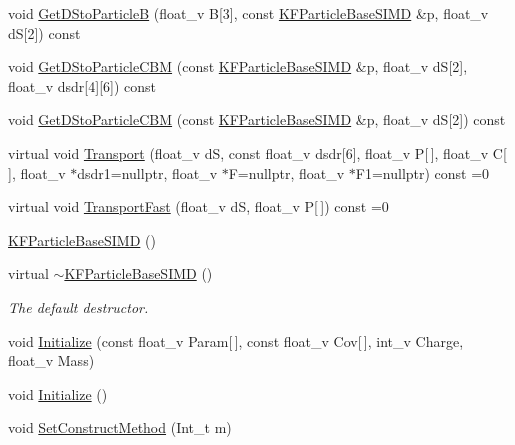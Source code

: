 \begin{DoxyCompactItemize}
\item 
void \hyperlink{classKFParticleBaseSIMD_a1b4d0c9300c389abefe0315f45faa26b}{Get\+D\+Sto\+ParticleB} (float\+\_\+v B\mbox{[}3\mbox{]}, const \hyperlink{classKFParticleBaseSIMD}{K\+F\+Particle\+Base\+S\+I\+MD} \&p, float\+\_\+v dS\mbox{[}2\mbox{]}) const 
\item 
void \hyperlink{classKFParticleBaseSIMD_acd7097a1ad5f82efff3812c01580e592}{Get\+D\+Sto\+Particle\+C\+BM} (const \hyperlink{classKFParticleBaseSIMD}{K\+F\+Particle\+Base\+S\+I\+MD} \&p, float\+\_\+v dS\mbox{[}2\mbox{]}, float\+\_\+v dsdr\mbox{[}4\mbox{]}\mbox{[}6\mbox{]}) const 
\item 
void \hyperlink{classKFParticleBaseSIMD_a0dd9de9d7915fd843abc49ffc9b53da1}{Get\+D\+Sto\+Particle\+C\+BM} (const \hyperlink{classKFParticleBaseSIMD}{K\+F\+Particle\+Base\+S\+I\+MD} \&p, float\+\_\+v dS\mbox{[}2\mbox{]}) const 
\item 
virtual void \hyperlink{classKFParticleBaseSIMD_aef008a05ee4b4c5c8fc88a8e7493ee70}{Transport} (float\+\_\+v dS, const float\+\_\+v dsdr\mbox{[}6\mbox{]}, float\+\_\+v P\mbox{[}$\,$\mbox{]}, float\+\_\+v C\mbox{[}$\,$\mbox{]}, float\+\_\+v $\ast$dsdr1=nullptr, float\+\_\+v $\ast$F=nullptr, float\+\_\+v $\ast$F1=nullptr) const =0
\item 
virtual void \hyperlink{classKFParticleBaseSIMD_a20c50860d7bc9f4e2c1047f8028320d1}{Transport\+Fast} (float\+\_\+v dS, float\+\_\+v P\mbox{[}$\,$\mbox{]}) const =0
\item 
\hyperlink{classKFParticleBaseSIMD_a6d298c2dfdaf132412630d18fbc0e94c}{K\+F\+Particle\+Base\+S\+I\+MD} ()
\item 
virtual \hyperlink{classKFParticleBaseSIMD_a8af269cd0effa0f4eaa7b7933b28c456}{$\sim$\+K\+F\+Particle\+Base\+S\+I\+MD} ()\hypertarget{classKFParticleBaseSIMD_a8af269cd0effa0f4eaa7b7933b28c456}{}\label{classKFParticleBaseSIMD_a8af269cd0effa0f4eaa7b7933b28c456}

\begin{DoxyCompactList}\small\item\em The default destructor. \end{DoxyCompactList}\item 
void \hyperlink{classKFParticleBaseSIMD_a20da6183e6320e398d5df7d72ff1ad8c}{Initialize} (const float\+\_\+v Param\mbox{[}$\,$\mbox{]}, const float\+\_\+v Cov\mbox{[}$\,$\mbox{]}, int\+\_\+v Charge, float\+\_\+v Mass)
\item 
void \hyperlink{classKFParticleBaseSIMD_a6fea58bda9e030e5ebee1b24e27efb46}{Initialize} ()
\item 
void \hyperlink{classKFParticleBaseSIMD_a51bd465905712fb71a33a9b7c20b966f}{Set\+Construct\+Method} (Int\+\_\+t m)\hypertarget{classKFParticleBaseSIMD_a51bd465905712fb71a33a9b7c20b966f}{}\label{classKFParticleBaseSIMD_a51bd465905712fb71a33a9b7c20b966f}


\end{DoxyCompactItemize}
